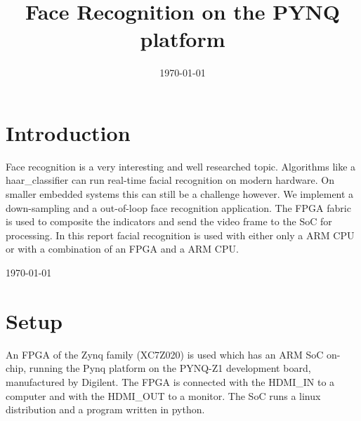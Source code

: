 \documentclass[conference]{IEEEtran}
\begin{document}
\title{Face Recognition on the PYNQ platform}


\author{
\and
{}
}
\date{\today}
\maketitle

\section{Introduction}
Face recognition is a very interesting and well researched topic. Algorithms like a haar\_classifier can run real-time facial recognition on modern hardware. On smaller embedded systems this can still be a challenge however. We implement a down-sampling and a out-of-loop face recognition application. The FPGA fabric is used to composite the indicators and send the video frame to the SoC for processing.
In this report facial recognition is used with either only a ARM CPU or with a combination of an FPGA and a ARM CPU.

\hfill \today
\section{Setup}
An FPGA of the Zynq family (XC7Z020) is used which has an ARM SoC on-chip, running the Pynq platform on the PYNQ-Z1 development board, manufactured by Digilent. The FPGA is connected with the HDMI\_IN to a computer and with the HDMI\_OUT to a monitor. The SoC runs a linux distribution and a program written in python.
\end{document}
